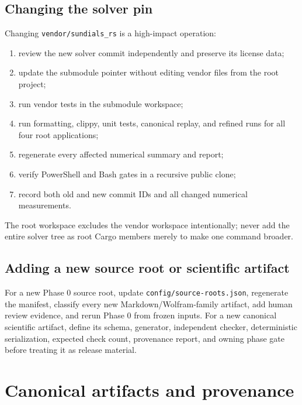\documentclass[11pt]{article}
\begin{document}
\subsection{Changing the solver pin}

Changing \texttt{vendor/s\allowbreak{}undials\_\allowbreak{}rs} is a high-impact operation:

\begin{enumerate}
\item review the new solver commit independently and preserve its license data;
\item update the submodule pointer without editing vendor files from the root
project;

\item run vendor tests in the submodule workspace;
\item run formatting, clippy, unit tests, canonical replay, and refined runs for
all four root applications;

\item regenerate every affected numerical summary and report;
\item verify PowerShell and Bash gates in a recursive public clone;
\item record both old and new commit IDs and all changed numerical measurements.
\end{enumerate}

The root workspace excludes the vendor workspace intentionally; never add the entire solver tree as root Cargo members merely to make one command broader.

\subsection{Adding a new source root or scientific artifact}

For a new Phase 0 source root, update \texttt{config/s\allowbreak{}ource-ro\allowbreak{}ots.json}, regenerate the manifest, classify every new Markdown/Wolfram-family artifact, add human review evidence, and rerun Phase 0 from frozen inputs. For a new canonical scientific artifact, define its schema, generator, independent checker, deterministic serialization, expected check count, provenance report, and owning phase gate before treating it as release material.

\section{Canonical artifacts and provenance}
\end{document}
